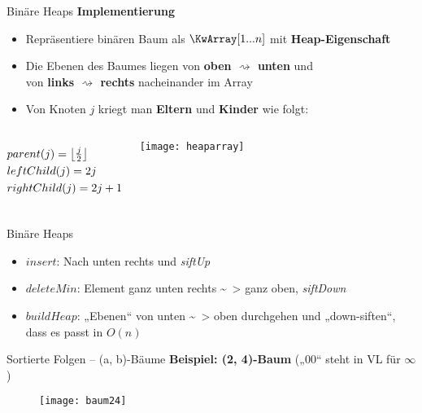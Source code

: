 \begin{frame}{Binäre Heaps}
	\textbf{Implementierung} \\
	\begin{itemize}
		\item Repräsentiere binären Baum als $\KwArray[1...n]$ mit \textbf{Heap-Eigenschaft}
		\item Die Ebenen des Baumes liegen von \textbf{oben $\rightsquigarrow$ unten} und \\ von \textbf{links $\rightsquigarrow$ rechts} nacheinander im Array 
		
		\item Von Knoten $j$ kriegt man \textbf{Eltern} und \textbf{Kinder} wie folgt:
	\end{itemize}

	\begin{columns}
		\vspace{-7\baselineskip} %
		\begin{align*}
		&parent(j) = \left\lfloor\tfrac{j}{2}\right\rfloor \\
		&leftChild(j) = 2j \\
		&rightChild(j) = 2j + 1
		\end{align*}
		
		\texttt{[image: heaparray]}
	\end{columns}
\end{frame}

\begin{frame}{Binäre Heaps}
	\begin{itemize}
		\item $insert$: Nach unten rechts und \emph{siftUp}
		\item $deleteMin$: Element ganz unten rechts \~~> ganz oben, \emph{siftDown}
		\item $buildHeap$: „Ebenen“ von unten \~~> oben durchgehen und „down-siften“, dass es passt \quad in $O(n)$
	\end{itemize}
\end{frame}





\begin{frame}{Sortierte Folgen -- (a, b)-Bäume}
	\textbf{Beispiel: (2, 4)-Baum} („00“ steht in VL für $\infty$) \\[0,125cm]
	\begin{figure}[htp]
		\centering
		\texttt{[image: baum24]}
	\end{figure}
\end{frame}



